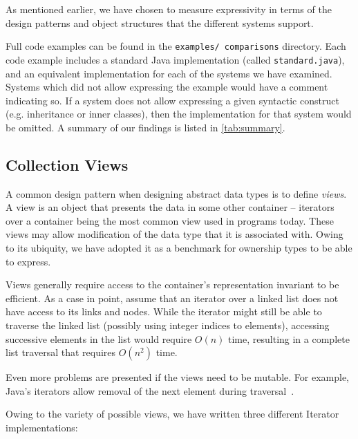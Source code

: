 \documentclass{acm_proc_article-sp}
\begin{document}
As mentioned earlier, we have chosen to measure expressivity in terms of the
design patterns and object structures that the different systems support.

Full code examples can be found in the \texttt{examples/\linebreak~comparisons}
directory. Each code example includes a standard Java implementation (called
\texttt{standard.java}), and an equivalent implementation for each of the
systems we have examined. Systems which did not allow expressing the example
would have a comment indicating so. If a system does not allow expressing a
given syntactic construct (e.g. inheritance or inner classes), then the
implementation for that system would be omitted. A summary of our findings is
listed in \cref{tab:summary}.

\subsection{Collection Views}
\label{subsec:views}

A common design pattern when designing abstract data types is to define
\emph{views}. A view is an object that presents the data in some other
container -- iterators over a container being the most common view used in
programs today. These views may allow modification of the data type that it
is associated with. Owing to its ubiquity, we have adopted it as a benchmark
for ownership types to be able to express.

Views generally require access to the container's representation invariant to
be efficient. As a case in point, assume that an iterator over a linked list
does not have access to its links and nodes. While the iterator might still be
able to traverse the linked list (possibly using integer indices to elements),
accessing successive elements in the list would require $O(n)$ time, resulting
in a complete list traversal that requires $O(n^2)$ time.

Even more problems are presented if the views need to be mutable. For example,
Java's iterators allow removal of the next element during
traversal~\cite{java8java_util_iterator}.

Owing to the variety of possible views, we have written three different
Iterator implementations:
\end{document}
